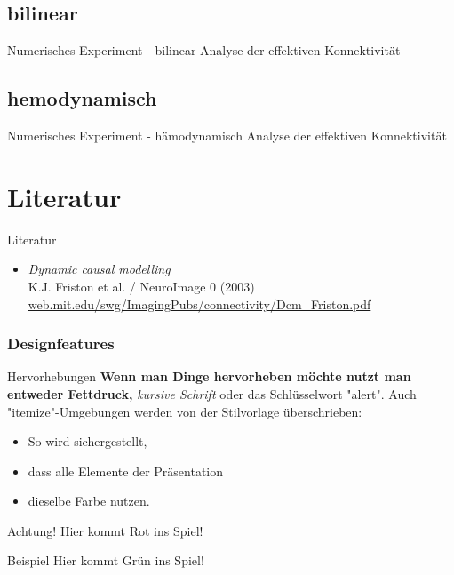 \documentclass{beamer}
\begin{document}
\subsection{bilinear}
	\begin{frame}{Numerisches Experiment - bilinear}
		Analyse der effektiven Konnektivität
	\end{frame}
\subsection{hemodynamisch}
	\begin{frame}{Numerisches Experiment - hämodynamisch}
		Analyse der effektiven Konnektivität
	\end{frame}

\section{Literatur}
	\begin{frame}{Literatur}
		\begin{itemize}
			\item \textit{Dynamic causal modelling} \\ {\small K.J. Friston et al. / NeuroImage 0 (2003)} \\ {\footnotesize \url{web.mit.edu/swg/ImagingPubs/connectivity/Dcm_Friston.pdf}}
		\end{itemize}
	\end{frame}



\begin{frame}
	\frametitle{Designfeatures}
	\begin{block}{Hervorhebungen}
	 \textbf{Wenn man Dinge hervorheben möchte nutzt man entweder Fettdruck,} \textit{ kursive Schrift} \alert{ oder das Schlüsselwort "alert"}. Auch "itemize"-Umgebungen werden von der Stilvorlage überschrieben:
	\end{block}
	\pause
	\begin{itemize}
	 \item So wird sichergestellt,
	 \item dass alle Elemente der Präsentation 
	 \item dieselbe Farbe nutzen.
	\end{itemize}
	\begin{alertblock}{Achtung!}
	 Hier kommt Rot ins Spiel!	
	\end{alertblock}
	\begin{exampleblock}{Beispiel}
	 Hier kommt Grün ins Spiel!
	\end{exampleblock}
\end{frame}
\end{document}
